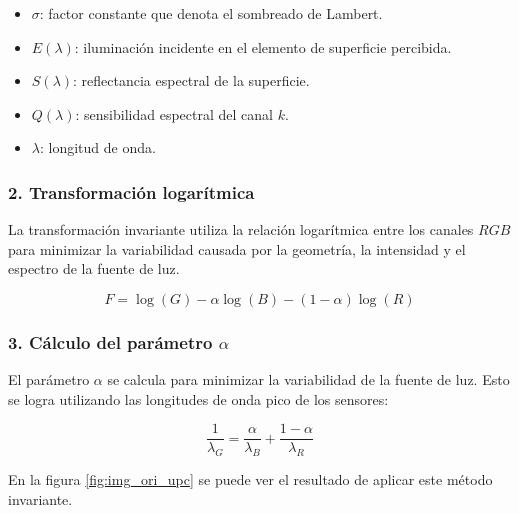 \begin{itemize}
\setlength{\itemsep}{-1ex}
   \item{\begin{flushleft} $\sigma$: factor constante que denota el sombreado de Lambert. \end{flushleft}}
   \item{\begin{flushleft} $E(\lambda )$: iluminación incidente en el elemento de superficie percibida. \end{flushleft}}
   \item{\begin{flushleft} $S(\lambda )$: reflectancia espectral de la superficie. \end{flushleft}}
   \item{\begin{flushleft} $Q(\lambda )$: sensibilidad espectral del canal $k$. \end{flushleft}}
   \item{\begin{flushleft} $\lambda$: longitud de onda. \end{flushleft}}
\end{itemize}

\subsubsection{2. Transformación logarítmica}

La transformación invariante utiliza la relación logarítmica entre los canales $RGB$ para minimizar la variabilidad causada por la geometría, la intensidad y el espectro de la fuente de luz.

$$F=\log (G)-\alpha \log (B)-(1-\alpha )\log (R)$$

\subsubsection{3. Cálculo del parámetro $\alpha$}

El parámetro $\alpha$ se calcula para minimizar la variabilidad de la fuente de luz. Esto se logra utilizando las longitudes de onda pico de los sensores:

$$\frac{1}{\lambda_G }=\frac{\alpha }{\lambda_B }+\frac{1-\alpha }{\lambda_R }$$

En la figura \ref{fig:img_ori_upc} se puede ver el resultado de aplicar este método invariante.

